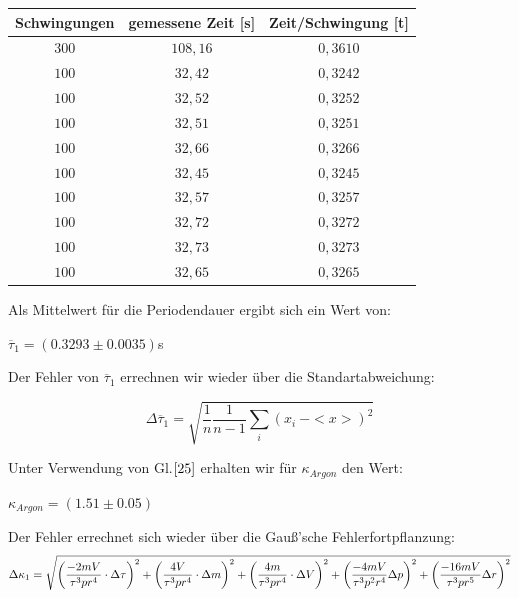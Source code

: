 \documentclass{article}
\begin{document}
{{\begin{center}
\begin{tabular}{c|c|c}
Schwingungen & gemessene Zeit [s]& Zeit/Schwingung [t]\\
\hline 
\(300\)	& \(108,16\)& \(0,3610\)\\
\(100\)	& \(32,42\)	& \(0,3242\)\\
\(100\)	& \(32,52\)	& \(0,3252\)\\
\(100\)	& \(32,51\)	& \(0,3251\)\\
\(100\)	& \(32,66\)	& \(0,3266\)\\
\(100\)	& \(32,45\)	& \(0,3245\)\\
\(100\)	& \(32,57\)	& \(0,3257\)\\
\(100\)	& \(32,72\)	& \(0,3272\)\\
\(100\)	& \(32,73\)	& \(0,3273\)\\
\(100\)	& \(32,65\)	& \(0,3265\)\\
\end{tabular}
\end{center}

\vspace{1cm}

Als Mittelwert für die Periodendauer ergibt sich ein Wert von:
\begin{center}
\(\overline{\tau}_{1} = (0.3293 \pm 0.0035)\)s
\end{center}

Der Fehler von \(\overline{\tau}_{1}\) errechnen wir wieder über die Standartabweichung:

\begin{equation}
\Delta \overline{\tau}_{1} = \sqrt{\frac{1}{n} \frac{1}{n-1}\sum\limits_{i}(x_i \ - <x>)^2}
\end{equation}

Unter Verwendung von Gl.\(\eqref{25}\) erhalten wir für \(\kappa_{Argon}\) den Wert:
\begin{center}
\(\kappa_{Argon} = (1.51 \pm 0.05)\)
\end{center}
Der Fehler errechnet sich wieder über die Gauß'sche Fehlerfortpflanzung:
\begin{equation}
\notag
\Delta \kappa_1 =\sqrt{\left( \frac{ -2mV}{ \tau^3 p r^4}\cdot \Delta \tau\right)^2 + \left( \frac{ 4V}{\tau^3 p r^4}\cdot \Delta m \right)^2+\left( \frac{4m }{\tau^3 p r^4}\cdot\Delta V \right)^2+\left( \frac{-4mV}{\tau^3 p^2 r^4}\Delta p \right)^2+\left( \frac{-16mV}{\tau^3 p r^5}\Delta r \right)^2}
\end{equation}

}}
\end{document}
